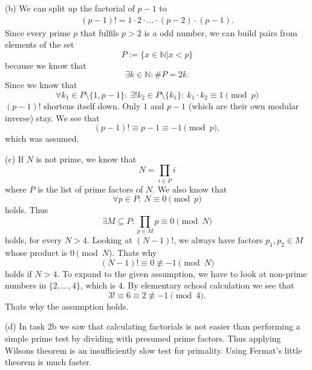 \documentclass[12pt]{article}
\begin{document}
 (b) We can split up the factorial of $p-1$ to \begin{gather}
 	(p-1)!=1\cdot 2\cdot\ldots\cdot (p-2)\cdot (p-1).
 \end{gather} Since every prime $p$ that fulfils $p>2$ is a odd number, we can build pairs from elements of the set \begin{equation}
 	P := \{x\in\mathbb{N}| x<p\}
 \end{equation} because we know that \begin{equation}
 	\exists k\in\mathbb{N}: \# P=2k.
 \end{equation} Since we know that \begin{equation}
 	\forall k_1\in P\setminus\{1,p-1\}:\ \exists! k_2\in P\setminus\{k_1\}:\ k_1\cdot k_2 \equiv 1 \pmod{p}
 \end{equation} $(p-1)!$ shortens itself down. Only $1$ and $p-1$ (which are their own modular inverse) stay. We see that \begin{equation}
 	(p-1)!\equiv p-1 \equiv -1 \pmod{p},
 \end{equation} which was assumed.
 
 (c) If $N$ is not prime, we know that \begin{equation}
 	N = \prod_{i\in P} i
 \end{equation} where $P$ is the list of prime factors of $N$. We also know that \begin{equation}
 	\forall p\in P:\ N \equiv 0 \pmod{p}
 \end{equation} holds. Thus \begin{equation}
 	\exists M\subseteq P: \prod_{p\in M}p \equiv 0 \pmod{N}
 \end{equation} holds, for every $N>4$. Looking at $(N-1)!$, we always have factors $p_1,p_2\in M$ whose product is $0 \pmod N$. Thats why \begin{equation}
 	(N-1)!\equiv 0 \not\equiv -1 \pmod{N}
 \end{equation} holds if $N>4$. To expand to the given assumption, we have to look at non-prime numbers in $\{2,\ldots, 4\}$, which is $4$. By elementary school calculation we see that \begin{equation}
 	3!\equiv 6\equiv 2\not\equiv -1\pmod{4}.
 \end{equation} Thats why the assumption holds.
 
 (d) In task 2b we saw that calculating factorials is not easier than performing a simple prime test by dividing with presumed prime factors. Thus applying Wilsons theorem is an insufficiently slow test for primality. Using Fermat's little theorem is much faster.
 
\end{document}
